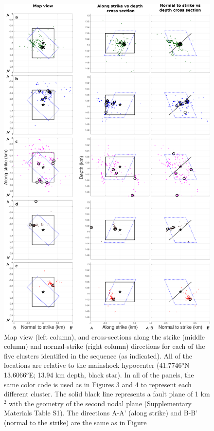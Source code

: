 \documentclass[a4paper,12pt,twoside]{article}
\begin{document}
\begin{figure}
    \centering
     
     \includegraphics[width=0.6\linewidth]{map_clusters_templates.pdf}     
\caption{Map view (left column), and cross-sections along the strike (middle column) and normal-strike (right column) directions for each of the five clusters identified in the sequence (as indicated). All of the locations are relative to the mainshock hypocenter (41.7746$^o$N 13.6066$^o$E; 13.94 km depth, black star). In all of the panels, the same color code is used as in Figures 3 and 4 to represent each different cluster. The solid black line represents a fault plane of 1 km$^2$ with the geometry of the second nodal plane (Supplementary Materials Table S1). The \protect{} directions A-A' (along strike) and B-B' (normal to the strike) are the same as in Figure \protect{} \protect{}}
\end{figure}          \label{fig:maps_each_cluster}
\end{document}
